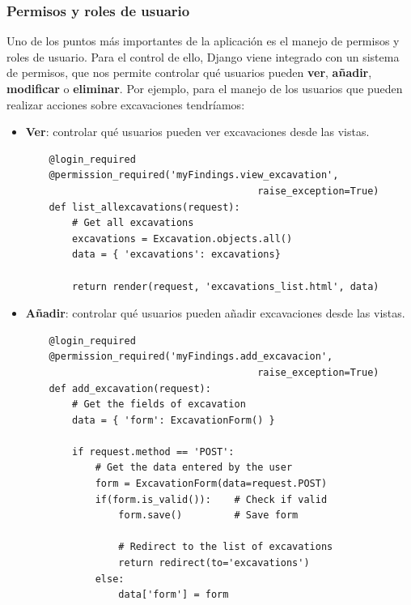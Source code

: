 \subsubsection{Permisos y roles de usuario}
Uno de los puntos más importantes de la aplicación es el manejo de permisos y roles de
usuario. Para el control de ello, Django viene integrado con un sistema de permisos,
que nos permite controlar qué usuarios pueden \textbf{ver}, \textbf{añadir}, \textbf{
modificar} o \textbf{eliminar}. Por ejemplo, para el manejo de los usuarios que pueden
realizar acciones sobre excavaciones tendríamos:

    \begin{itemize}
        \item \textbf{Ver}: controlar qué usuarios pueden ver excavaciones desde las
        vistas.
    \begin{verbatim}
    @login_required
    @permission_required('myFindings.view_excavation', 
                                        raise_exception=True)
    def list_allexcavations(request):
        # Get all excavations
        excavations = Excavation.objects.all()
        data = { 'excavations': excavations}
    
        return render(request, 'excavations_list.html', data)
    \end{verbatim}

        \item \textbf{Añadir}: controlar qué usuarios pueden añadir excavaciones
        desde las vistas.
    \begin{verbatim}
    @login_required
    @permission_required('myFindings.add_excavacion', 
                                        raise_exception=True)
    def add_excavation(request):
        # Get the fields of excavation
        data = { 'form': ExcavationForm() }
    
        if request.method == 'POST':
            # Get the data entered by the user
            form = ExcavationForm(data=request.POST)
            if(form.is_valid()):    # Check if valid
                form.save()         # Save form
    
                # Redirect to the list of excavations
                return redirect(to='excavations')
            else:
                data['form'] = form
    

\end{verbatim}
\end{itemize}
